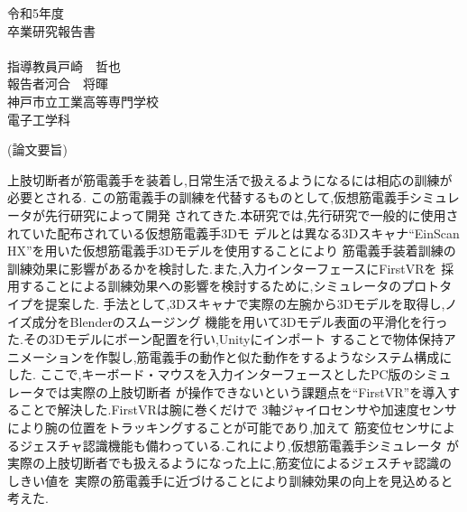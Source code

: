 \documentclass{ltjsreport}
\begin{document}
\begin{titlepage}
\begin{center}
\huge 令和5年度\\
\vspace{30pt}
\huge 卒業研究報告書\\
\vspace{50pt}
\HUGE{}\\
\vspace{250pt}
\huge 指導教員\hspace{10pt}戸崎　哲也\\
\huge 報告者\hspace{28pt}河合　将暉\\
\vspace{50pt}
\huge 神戸市立工業高等専門学校\\
\huge 電子工学科
\end{center}
\end{titlepage}
\restoregeometry
\clearpage

\begin{center}
\LARGE (論文要旨)
\end{center}
上肢切断者が筋電義手を装着し,日常生活で扱えるようになるには相応の訓練が必要とされる.
この筋電義手の訓練を代替するものとして,仮想筋電義手シミュレータが先行研究によって開発
されてきた.本研究では,先行研究で一般的に使用されていた配布されている仮想筋電義手3Dモ
デルとは異なる3Dスキャナ``EinScan HX''を用いた仮想筋電義手3Dモデルを使用することにより
筋電義手装着訓練の訓練効果に影響があるかを検討した.また,入力インターフェースにFirstVRを
採用することによる訓練効果への影響を検討するために,シミュレータのプロトタイプを提案した.
手法として,3Dスキャナで実際の左腕から3Dモデルを取得し,ノイズ成分をBlenderのスムージング
機能を用いて3Dモデル表面の平滑化を行った.その3Dモデルにボーン配置を行い,Unityにインポート
することで物体保持アニメーションを作製し,筋電義手の動作と似た動作をするようなシステム構成にした.
ここで,キーボード・マウスを入力インターフェースとしたPC版のシミュレータでは実際の上肢切断者
が操作できないという課題点を``FirstVR''を導入することで解決した.FirstVRは腕に巻くだけで
3軸ジャイロセンサや加速度センサにより腕の位置をトラッキングすることが可能であり,加えて
筋変位センサによるジェスチャ認識機能も備わっている.これにより,仮想筋電義手シミュレータ
が実際の上肢切断者でも扱えるようになった上に,筋変位によるジェスチャ認識のしきい値を
実際の筋電義手に近づけることにより訓練効果の向上を見込めると考えた.
\end{document}
